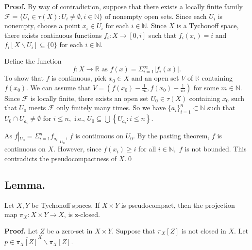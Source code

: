 \documentclass{article}
\begin{document}
		  \vskip 20pt

		  \textbf{Proof.} By way of contradiction, suppose that there exists a locally finite family $\mathcal{F}=\{U_i \in \tau(X): U_i\neq \emptyset, i\in \mathbb{N}\}$ of nonempty open sets. Since each $U_i$ is nonempty, choose a point $x_i\in U_i$ for each $i\in \mathbb{N}$. Since 
		  $X$ is a Tychonoff space, there exists continuous functions $f_i:X \rightarrow [0,i]$ such that $f_i(x_i)=i$ and 
		  $f_i[X \backslash U_i] \subseteq \{0\}$ for each $i \in \mathbb{N}$.

		  \vskip 20pt

		  Define the function $$f:X\rightarrow \mathbb{R} \mbox{ as } f(x)=\Sigma_{i=1}^\infty |f_i(x)|.$$ To show that $f$ is continuous, pick $x_0\in X$ and an open set $V$ of $\mathbb{R}$ containing $f(x_0)$. 
		  We can assume that  $V=(f(x_0)-\frac{1}{m}, f(x_0)+\frac{1}{m})$ for some $m \in \mathbb{N}$.
		  Since $\mathcal{F}$ is locally finite, there exists an open set $U_0 \in \tau(X)$ containing $x_0$ such that $U_0$ meets $\mathcal{F}$ only finitely many times. 
		  So we have $\{a_i\}_{i=1}^{n} \subset \mathbb{N}$ such that $U_0\cap U_{a_i} \neq \emptyset$ for $i\leq n,$ i.e., $U_0\subseteq \bigcup \left\{U_{a_i}: i\leq n\right\}.$

		  \vskip 20pt
		  As $f|_{U_0} = \Sigma_{i=1}^{n} f_{a_i} |_{U_0}$, $f$ is continuous on $U_0$. By the pasting theorem, $f$ is continuous on $X$.
		  However, since $f(x_i) \geq i$ for all $i\in \mathbb{N},$ $f$ is  not bounded. This contradicts the pseudocompactness of $X$.\qed










		  \vskip 40pt













		  \subsection{Lemma.} Let $X, Y$ be Tychonoff spaces. If $X\times Y$ is pseudocompact, then the projection map $\pi_X: X\times Y\rightarrow X$, is z-closed. 

		  \vskip 20pt

		  \textbf{Proof.} Let $Z$ be a zero-set in $X\times Y$. Suppose that $\pi_X[Z]$ is not closed in $X$. Let $p\in \overline{\pi_X[Z]}^X\backslash \pi_X[Z].$ 
\end{document}
